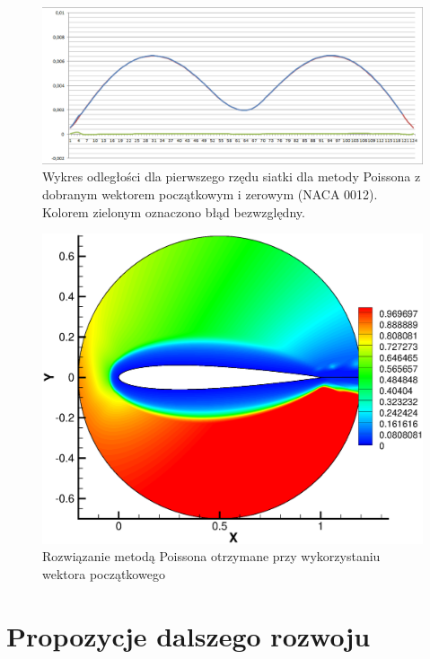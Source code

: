 \begin{figure}[h] 
	\includegraphics[trim = 30mm 0mm 0mm 0mm, width=1.1\linewidth]{Rysunki/NACA_0012_wykres_odleglosci_guess.png}
	\caption{Wykres odległości dla pierwszego rzędu siatki dla metody Poissona z \colorbox{red!30}{dobranym} wektorem początkowym i \colorbox{blue!30}{zerowym} (NACA 0012). Kolorem zielonym oznaczono \colorbox{green!30}{błąd bezwzględny}.}
	\label{fig:graph_NACA_0012_guess}
\end{figure}

\begin{figure}[H]	
    \centering
    \includegraphics[trim = 22mm 10mm 10mm 20mm, width=0.9\linewidth]{Rysunki/NACA_0012_profil_poisson_guess.eps}    
	\caption{Rozwiązanie metodą Poissona otrzymane przy wykorzystaniu wektora początkowego}
\end{figure}

\section{Propozycje dalszego rozwoju}

